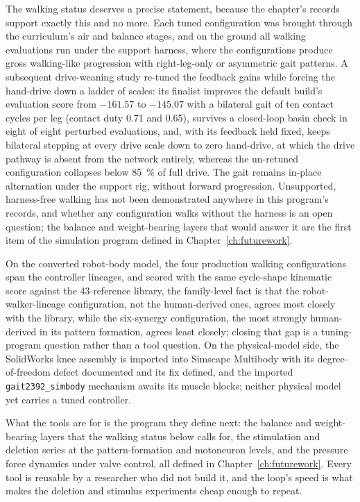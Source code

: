 The walking status deserves a precise statement, because the chapter's records support exactly this and no more. Each tuned configuration was brought through the curriculum's air and balance stages, and on the ground all walking evaluations run under the support harness, where the configurations produce gross walking-like progression with right-leg-only or asymmetric gait patterns. A subsequent drive-weaning study re-tuned the feedback gains while forcing the hand-drive down a ladder of scales: its finalist improves the default build's evaluation score from $-161.57$ to $-145.07$ with a bilateral gait of ten contact cycles per leg (contact duty 0.71 and 0.65), survives a closed-loop basin check in eight of eight perturbed evaluations, and, with its feedback held fixed, keeps bilateral stepping at every drive scale down to zero hand-drive, at which the drive pathway is absent from the network entirely, whereas the un-retuned configuration collapses below \qty{85}{\percent} of full drive. The gait remains in-place alternation under the support rig, without forward progression. Unsupported, harness-free walking has not been demonstrated anywhere in this program's records, and whether any configuration walks without the harness is an open question; the balance and weight-bearing layers that would answer it are the first item of the simulation program defined in Chapter~\ref{ch:futurework}.

On the converted robot-body model, the four production walking configurations span the controller lineages, and scored with the same cycle-shape kinematic score against the 43-reference library, the family-level fact is that the robot-walker-lineage configuration, not the human-derived ones, agrees most closely with the library, while the six-synergy configuration, the most strongly human-derived in its pattern formation, agrees least closely; closing that gap is a tuning-program question rather than a tool question. On the physical-model side, the SolidWorks knee assembly is imported into Simscape Multibody with its degree-of-freedom defect documented and its fix defined, and the imported \texttt{gait2392\_simbody} mechanism awaits its muscle blocks; neither physical model yet carries a tuned controller.

What the tools are for is the program they define next: the balance and weight-bearing layers that the walking status below calls for, the stimulation and deletion series at the pattern-formation and motoneuron levels, and the pressure--force dynamics under valve control, all defined in Chapter~\ref{ch:futurework}. Every tool is reusable by a researcher who did not build it, and the loop's speed is what makes the deletion and stimulus experiments cheap enough to repeat.
